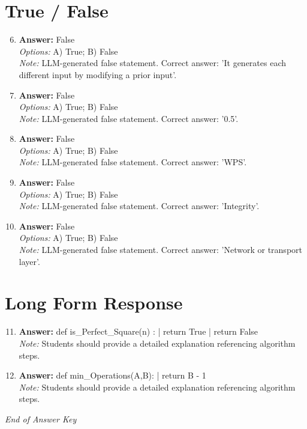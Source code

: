 \documentclass[12pt]{article}
\begin{document}
\section*{True / False}
\begin{enumerate}[label=\arabic*.]
\setcounter{enumi}{5}
\item \textbf{Answer:} False
\\ \textit{Options:} A) True; B) False
\\ \textit{Note:} LLM-generated false statement. Correct answer: 'It generates each different input by modifying a prior input'.
\item \textbf{Answer:} False
\\ \textit{Options:} A) True; B) False
\\ \textit{Note:} LLM-generated false statement. Correct answer: '0.5'.
\item \textbf{Answer:} False
\\ \textit{Options:} A) True; B) False
\\ \textit{Note:} LLM-generated false statement. Correct answer: 'WPS'.
\item \textbf{Answer:} False
\\ \textit{Options:} A) True; B) False
\\ \textit{Note:} LLM-generated false statement. Correct answer: 'Integrity'.
\item \textbf{Answer:} False
\\ \textit{Options:} A) True; B) False
\\ \textit{Note:} LLM-generated false statement. Correct answer: 'Network or transport layer'.
\end{enumerate}

\section*{Long Form Response}
\begin{enumerate}[label=\arabic*.]
\setcounter{enumi}{10}
\item \textbf{Answer:} def is\_Perfect\_Square(n) : | return True | return False
\\ \textit{Note:} Students should provide a detailed explanation referencing algorithm steps.
\item \textbf{Answer:} def min\_Operations(A,B): | return B - 1
\\ \textit{Note:} Students should provide a detailed explanation referencing algorithm steps.
\end{enumerate}

\vfill
\noindent\textit{End of Answer Key}
\end{document}
